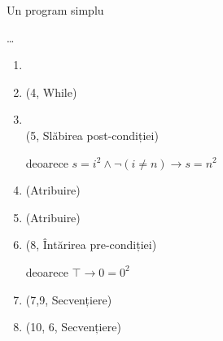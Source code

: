 %
%

\begin{frame}{Un program simplu}
\begin{example}[cont.]

\ldots
\begin{enumerate}[<+->]
{\setcounter{enumi}{3}}
	\item {}
	\item {} \hfill(4, While)
	\item {}\\ \hfill(5, Slăbirea post-condiției)

	deoarece $s=i^2 \wedge \neg (i \neq n) \to s = n^2$
	\item {} \hfill (Atribuire)
	\item {} \hfill (Atribuire)
	\item {} \hfill (8, Întărirea pre-condiției)

	deoarece $\top \to 0 = 0^ 2$
	\item {} \hfill(7,9, Secvențiere)
	\item {} \hfill(10, 6, Secvențiere)
\end{enumerate}
\end{example}
\end{frame}

